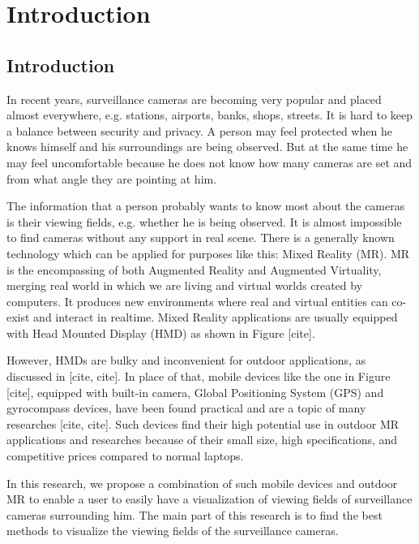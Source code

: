\chapter{Introduction} %
\label{Chapter1}

\section{Introduction}

In recent years, surveillance cameras are becoming very popular and placed almost everywhere, e.g. stations, airports, banks, shops, streets. It is hard to keep a balance between security and privacy. A person may feel protected when he knows himself and his surroundings are being observed. But at the same time he may feel uncomfortable because he does not know how many cameras are set and from what angle they are pointing at him.

The information that a person probably wants to know most about the cameras is their viewing fields, e.g. whether he is being observed. It is almost impossible to find cameras without any support in real scene. There is a generally known technology which can be applied for purposes like this: Mixed Reality (MR). MR is the encompassing of both Augmented Reality and Augmented Virtuality, merging real world in which we are living and virtual worlds created by computers. It produces new environments where real and virtual entities can co-exist and interact in realtime. Mixed Reality applications are usually equipped with Head Mounted Display (HMD) as shown in Figure [cite].

However, HMDs are bulky and inconvenient for outdoor applications, as discussed in [cite, cite]. In place of that, mobile devices like the one in Figure [cite], equipped with built-in camera, Global Positioning System (GPS) and gyrocompass devices, have been found practical and are a topic of many researches [cite, cite]. Such devices find their high potential use in outdoor MR applications and researches because of their small size, high specifications, and competitive prices compared to normal laptops.

In this research, we propose a combination of such mobile devices and outdoor MR to enable a user to easily have a visualization of viewing fields of surveillance cameras surrounding him. The main part of this research is to find the best methods to visualize the viewing fields of the surveillance cameras.

